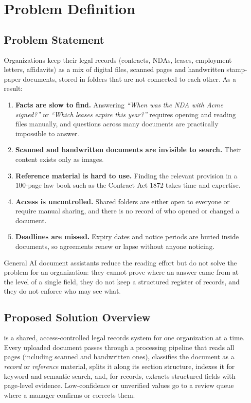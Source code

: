 \chapter{Problem Definition}

\section{Problem Statement}
Organizations keep their legal records (contracts, NDAs, leases, employment letters, affidavits)
as a mix of digital files, scanned pages and handwritten stamp-paper documents, stored in folders that
are not connected to each other. As a result:
\begin{enumerate}
\item \textbf{Facts are slow to find.} Answering \emph{``When was the NDA with Acme signed?''} or
\emph{``Which leases expire this year?''} requires opening and reading files manually, and questions
across many documents are practically impossible to answer.
\item \textbf{Scanned and handwritten documents are invisible to search.} Their content exists only as
images.
\item \textbf{Reference material is hard to use.} Finding the relevant provision in a 100-page law book
such as the Contract Act 1872 takes time and expertise.
\item \textbf{Access is uncontrolled.} Shared folders are either open to everyone or require manual
sharing, and there is no record of who opened or changed a document.
\item \textbf{Deadlines are missed.} Expiry dates and notice periods are buried inside documents, so
agreements renew or lapse without anyone noticing.
\end{enumerate}
General AI document assistants reduce the reading effort but do not solve the problem for an
organization: they cannot prove where an answer came from at the level of a single field, they do not
keep a structured register of records, and they do not enforce who may see what.

\section{Proposed Solution Overview}
\sysname{} is a shared, access-controlled legal records system for one organization at a time. Every
uploaded document passes through a processing pipeline that reads all pages (including scanned and
handwritten ones), classifies the document as a \emph{record} or \emph{reference} material, splits it
along its section structure, indexes it for keyword and semantic search, and, for records, extracts
structured fields with page-level evidence. Low-confidence or unverified values go to a review queue
where a manager confirms or corrects them.

